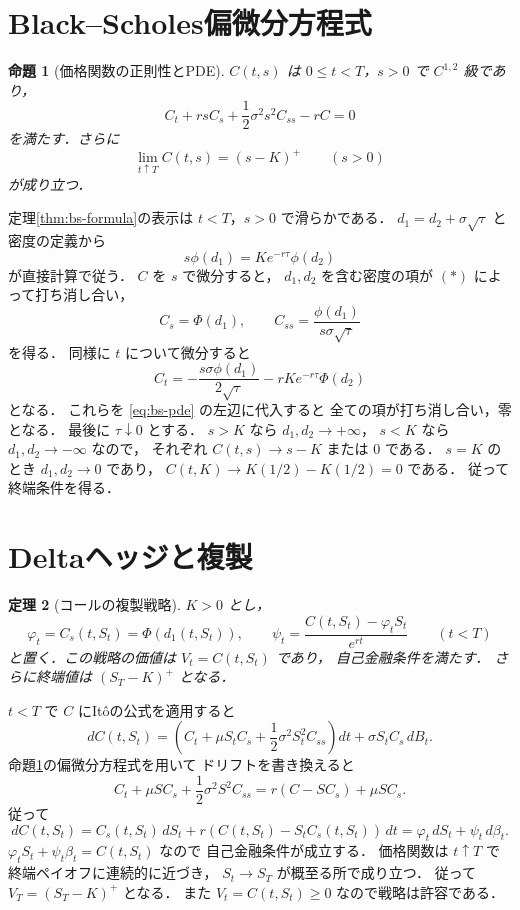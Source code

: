 \documentclass[a5paper,10pt,onecolumn]{jsarticle}
\makeatletter
\theoremstyle{mathnotetheorem}
\newtheorem{theorem}{定理}[section]
\newtheorem{proposition}[theorem]{命題}
\renewcommand{\proofname}{証明}
\renewenvironment{proof}[1][\proofname]{%
  \par\pushQED{\qed}\normalfont\topsep4\p@\@plus2\p@\relax
  \trivlist\item[\hskip\labelsep\bfseries #1]\ignorespaces
}{\popQED\endtrivlist\@endpefalse}
\makeatother
\begin{document}
\section{Black--Scholes偏微分方程式}

\begin{proposition}[価格関数の正則性とPDE]\label{prop:bs-pde}
$C(t,s)$ は $0\le t<T$，$s>0$ で $C^{1,2}$ 級であり，
\begin{equation}\label{eq:bs-pde}
 C_t+rsC_s+\frac12\sigma^2s^2C_{ss}-rC=0
\end{equation}
を満たす．さらに
\[
 \lim_{t\uparrow T}C(t,s)=(s-K)^+
 \qquad(s>0)
\]
が成り立つ．
\end{proposition}
\begin{proof}
定理\ref{thm:bs-formula}の表示は $t<T$，$s>0$ で滑らかである．
$d_1=d_2+\sigma\sqrt\tau$ と密度の定義から
\[
 s\phi(d_1)=Ke^{-r\tau}\phi(d_2)
 \tag{$*$}
\]
が直接計算で従う．
$C$ を $s$ で微分すると，
$d_1,d_2$ を含む密度の項が $(*)$ によって打ち消し合い，
\[
 C_s=\Phi(d_1),\qquad
 C_{ss}=\frac{\phi(d_1)}{s\sigma\sqrt\tau}
\]
を得る．
同様に $t$ について微分すると
\[
 C_t=-\frac{s\sigma\phi(d_1)}{2\sqrt\tau}
      -rKe^{-r\tau}\Phi(d_2)
\]
となる．
これらを \eqref{eq:bs-pde} の左辺に代入すると
全ての項が打ち消し合い，零となる．
最後に $\tau\downarrow0$ とする．
$s>K$ なら $d_1,d_2\to+\infty$，
$s<K$ なら $d_1,d_2\to-\infty$ なので，
それぞれ $C(t,s)\to s-K$ または $0$ である．
$s=K$ のとき $d_1,d_2\to0$ であり，
$C(t,K)\to K(1/2)-K(1/2)=0$ である．
従って終端条件を得る．
\end{proof}

\section{Deltaヘッジと複製}

\begin{theorem}[コールの複製戦略]\label{thm:delta}
$K>0$ とし，
\[
 \varphi_t=C_s(t,S_t)=\Phi(d_1(t,S_t)),\qquad
 \psi_t=\frac{C(t,S_t)-\varphi_tS_t}{e^{rt}}
 \qquad(t<T)
\]
と置く．この戦略の価値は $V_t=C(t,S_t)$ であり，
自己金融条件を満たす．
さらに終端値は $(S_T-K)^+$ となる．
\end{theorem}
\begin{proof}
$t<T$ で $C$ にIt\^oの公式を適用すると
\[
 dC(t,S_t)=
 \left(C_t+\mu S_t C_s
 +\frac12\sigma^2S_t^2C_{ss}\right)dt
 +\sigma S_tC_s\,dB_t.
\]
命題\ref{prop:bs-pde}の偏微分方程式を用いて
ドリフトを書き換えると
\[
 C_t+\mu SC_s+\frac12\sigma^2S^2C_{ss}
 =r(C-SC_s)+\mu SC_s.
\]
従って
\[
 dC(t,S_t)
 =C_s(t,S_t)\,dS_t+r(C(t,S_t)-S_tC_s(t,S_t))\,dt
 =\varphi_t\,dS_t+\psi_t\,d\beta_t.
\]
$\varphi_tS_t+\psi_t\beta_t=C(t,S_t)$ なので
自己金融条件が成立する．
価格関数は $t\uparrow T$ で終端ペイオフに連続的に近づき，
$S_t\to S_T$ が概至る所で成り立つ．
従って $V_T=(S_T-K)^+$ となる．
また $V_t=C(t,S_t)\ge0$ なので戦略は許容である．
\end{proof}
\end{document}
